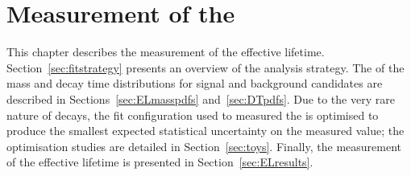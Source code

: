 \chapter{{\bf Measurement of the }}
\label{sec:lifetimemeasurement}

This chapter describes the measurement of the \bsmumu effective lifetime. %
Section~\ref{sec:fitstrategy} presents an overview of the analysis strategy. %
The \pdfs of the mass and decay time distributions for signal and background candidates are described in Sections~\ref{sec:ELmasspdfs} and~\ref{sec:DTpdfs}. Due to the very rare nature of \bsmumu decays, the fit configuration used to measured the \el is optimised to produce the smallest expected statistical uncertainty on the measured value; the optimisation studies are detailed in Section~\ref{sec:toys}. Finally, the measurement of the \bsmumu effective lifetime is presented in Section~\ref{sec:ELresults}.







